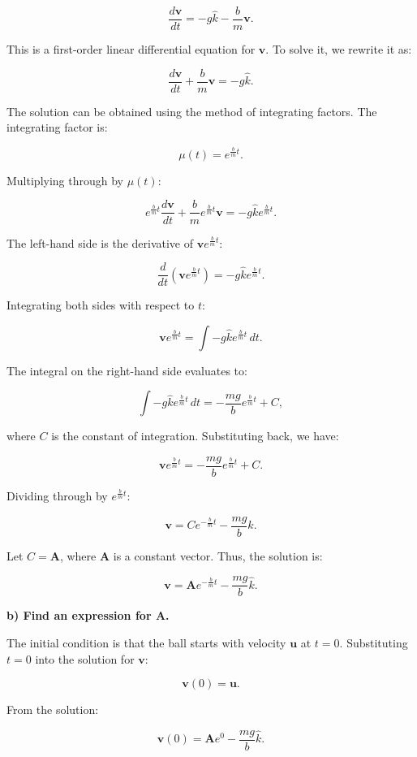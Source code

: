 \[
\frac{d \mathbf{v}}{dt} = -g\hat{k} - \frac{b}{m}\mathbf{v}.
\]

This is a first-order linear differential equation for $\mathbf{v}$. To solve it, we rewrite it as:

\[
\frac{d \mathbf{v}}{dt} + \frac{b}{m}\mathbf{v} = -g\hat{k}.
\]

The solution can be obtained using the method of integrating factors. The integrating factor is:

\[
\mu(t) = e^{\frac{b}{m}t}.
\]

Multiplying through by $\mu(t)$:

\[
e^{\frac{b}{m}t} \frac{d \mathbf{v}}{dt} + \frac{b}{m} e^{\frac{b}{m}t} \mathbf{v} = -g\hat{k} e^{\frac{b}{m}t}.
\]

The left-hand side is the derivative of $\mathbf{v} e^{\frac{b}{m}t}$:

\[
\frac{d}{dt} \left( \mathbf{v} e^{\frac{b}{m}t} \right) = -g\hat{k} e^{\frac{b}{m}t}.
\]

Integrating both sides with respect to $t$:

\[
\mathbf{v} e^{\frac{b}{m}t} = \int -g\hat{k} e^{\frac{b}{m}t} \, dt.
\]

The integral on the right-hand side evaluates to:

\[
\int -g\hat{k} e^{\frac{b}{m}t} \, dt = -\frac{mg}{b} e^{\frac{b}{m}t} + C,
\]

where $C$ is the constant of integration. Substituting back, we have:

\[
\mathbf{v} e^{\frac{b}{m}t} = -\frac{mg}{b} e^{\frac{b}{m}t} + C.
\]

Dividing through by $e^{\frac{b}{m}t}$:

\[
\mathbf{v} = C e^{-\frac{b}{m}t} - \frac{mg}{b} \hat{k}.
\]

Let $C = \mathbf{A}$, where $\mathbf{A}$ is a constant vector. Thus, the solution is:

\[
\mathbf{v} = \mathbf{A} e^{-\frac{b}{m}t} - \frac{mg}{b} \hat{k}.
\]

\textbf{b) Find an expression for $\mathbf{A}$.}

The initial condition is that the ball starts with velocity $\mathbf{u}$ at $t = 0$. Substituting $t = 0$ into the solution for $\mathbf{v}$:

\[
\mathbf{v}(0) = \mathbf{u}.
\]

From the solution:

\[
\mathbf{v}(0) = \mathbf{A} e^{0} - \frac{mg}{b} \hat{k}.
\]

